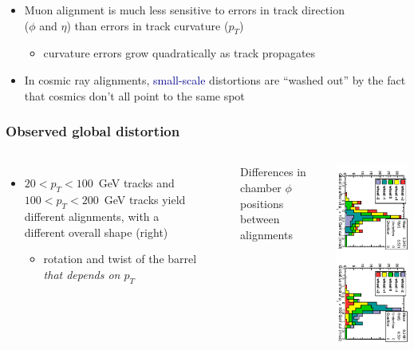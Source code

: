 \documentclass[compress]{beamer}
\begin{document}
\begin{frame}
\begin{itemize}
\item Muon alignment is much less sensitive to errors in track
  direction \\ ($\phi$ and $\eta$) than errors in track curvature ($p_T$)
\begin{itemize}
\item curvature errors grow quadratically as track propagates
\end{itemize}

\item In cosmic ray alignments, \textcolor{darkblue}{small-scale} distortions are ``washed out'' by the fact that cosmics don't all point to the same spot
\end{itemize}
\end{frame}

\begin{frame}
\frametitle{Observed global distortion}
\begin{columns}
\begin{itemize}
\item $20 < p_T < 100$~GeV tracks and $100 < p_T < 200$~GeV tracks yield different alignments, with a different overall shape {\scriptsize (right)}
\begin{itemize}
\item rotation and twist of the barrel {\it that depends on $p_T$}
\end{itemize}
\end{itemize}

\mbox{ }

{\tiny \hfill Differences in chamber $\phi$ positions between alignments}

\vspace{0.1 cm}
\includegraphics[height=\linewidth, angle=90]{data_effect_of_100GeVcut3.pdf}


\end{columns}
\end{frame}
\end{document}
